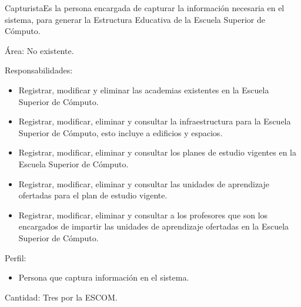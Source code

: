 \begin{actor}{Capturista}{Es la persona encargada de capturar la información necesaria en el sistema, para generar la Estructura Educativa de la Escuela Superior de Cómputo.}
	
	\item[Área:] No existente.
	\item[Responsabilidades:] \hspace{1pt}
	\begin{itemize}
		\item Registrar, modificar y eliminar las academias existentes en la Escuela Superior de Cómputo.
		
		\item Registrar, modificar, eliminar y consultar la infraestructura para la Escuela Superior de Cómputo, esto incluye a edificios y espacios.
		
		\item Registrar, modificar, eliminar y consultar los planes de estudio vigentes en la Escuela Superior de Cómputo.
		
		\item Registrar, modificar, eliminar y consultar las unidades de aprendizaje ofertadas para el plan de estudio vigente. 
		
		\item Registrar, modificar, eliminar y consultar a los profesores que son los encargados de impartir las unidades de aprendizaje ofertadas en la Escuela Superior de Cómputo. 
		
	\end{itemize}
	\item[Perfil:] \hspace{1pt}
	\begin{itemize}
		\item Persona que captura información en el sistema.
	\end{itemize}
	\item[Cantidad:] Tres por la ESCOM.
\end{actor}


